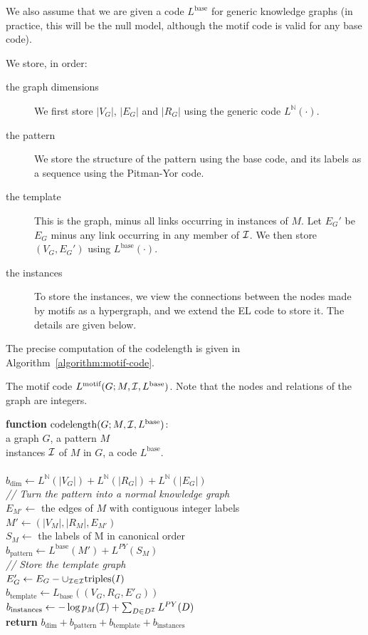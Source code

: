 \documentclass[runningheads]{style/llncs}
\newcommand{\N}{{\mathbb N}}
\newcommand{\I}{{\cal I}}
\newcommand{\tab}{\hspace*{5mm}}
\begin{document}
We also assume that we are given a code $L^\text{base}$ for generic knowledge graphs (in practice, this will be the null model, although the motif code is valid for any base code).

We store, in order:

\begin{description}
 \item[the graph dimensions] We first store $|V_G|$, $|E_G|$ and $|R_G|$ using the generic code $L^{\N}(\cdot)$. 
 \item[the pattern] We store the structure of the pattern using the base code, and its labels as a sequence using the Pitman-Yor code.
 \item[the template] This is the graph, minus all links occurring in instances of $M$. Let $E_G'$ be $E_G$ minus any link occurring in any member of $\cal I$. We then store $(V_G, E_G')$ using $L^\text{base}(\cdot)$.
 \item[the instances] To store the instances, we view the connections between the nodes made by motifs as a hypergraph, and we extend the EL code to store it. The details are given below.
\end{description}

The precise computation of the codelength is given in Algorithm~\ref{algorithm:motif-code}. 

\begin{pseudo}[tb]
\caption{The motif code $L^\text{motif}(G ; M, {\cal I}, L^\text{base})$. Note that the nodes and relations of the graph are integers.}
\label{algorithm:motif-code}
{ 
\textbf{function} $\text{codelength}(G; M, {\cal I}, L^\text{base})$:\\
\tab\tab a graph $G$, a pattern $M$\\ 
\tab\tab instances $\cal I$ of $M$ in $G$, a code $L^\text{base}$.\\
\\
$b_\text{dim} \leftarrow L^\N(|V_G|) + L^\N(|R_G|) + L^\N(|E_G|)$ \\

\emph{// Turn the pattern into a normal knowledge graph}\\
$E_{M'} \leftarrow$ the edges of $M$ with contiguous integer labels \\
$M' \leftarrow (|V_M|, |R_M|, E_{M'})$ \\
$S_M \leftarrow$ the labels of M in canonical order \\
$b_\text{pattern} \leftarrow L^\text{base}(M') + L^{PY}(S_M) $\\

\emph{// Store the template graph}\\
$E'_G \leftarrow E_G - \cup_{\I \in {\cal I}} \text{triples}(I)$ \\
$b_\text{template} \leftarrow L_\text{base}((V_G, R_G, E'_G))$\\

$b_\text{instances} \leftarrow -\log p_M(\I) + \sum_{D \in D^{\I}} L^{PY}(D)$\\

\textbf{return} $b_\text{dim} + b_\text{pattern} + b_\text{template} + b_\text{instances}$\\
}
\end{pseudo} 
\end{document}
